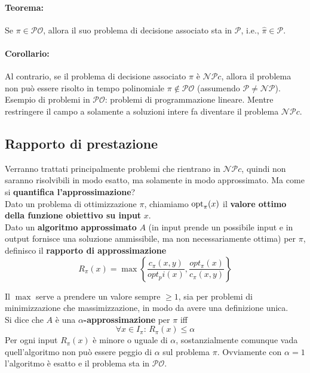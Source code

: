\paragraph{Teorema:} Se $\pi \in \mathcal{PO}$, allora il suo problema di decisione associato sta in $\mathcal{P}$, i.e., $\hat{\pi} \in \mathcal{P}$.\\

\paragraph{Corollario:} Al contrario, se il problema di decisione associato $\hat{\pi}$ è $\mathcal{NP}c$, allora il problema non può essere risolto in tempo polinomiale $\pi \notin \mathcal{PO}$ (assumendo $\mathcal{P} \neq \mathcal{NP}$).\\

Esempio di problemi in $\mathcal{PO}$: problemi di programmazione lineare. Mentre restringere il campo a solamente a soluzioni intere fa diventare il problema $\mathcal{NP}c$.\\

\newpage

\subsection{Rapporto di prestazione} 

Verranno trattati principalmente problemi che rientrano in $\mathcal{NP}c$, quindi non saranno risolvibili in modo esatto, ma solamente in modo approssimato. Ma come si \textbf{quantifica l'approssimazione}? \\

Dato un problema di ottimizzazione $\pi$, chiamiamo $\operatorname*{opt}_\pi (x)$ il \textbf{valore ottimo della funzione obiettivo su input} $x$.\\
Dato un \textbf{algoritmo approssimato} $A$ (in input prende un possibile input e in output fornisce una soluzione ammissibile, ma non necessariamente ottima) per $\pi$, definisco il \textbf{rapporto di approssimazione} 
$$ R_\pi (x) = \max \left\{\frac{c_\pi (x,y)}{opt_pi(x)}, \frac{opt_\pi (x)}{c_\pi (x,y)} \right\} $$

Il $\max$ serve a prendere un valore sempre $\geq 1$, sia per problemi di minimizzazione che massimizzazione, in modo da avere una definizione unica.\\

Si dice che $A$ è una \textbf{$\alpha$-approssimazione} per $\pi$ iff 
$$ \forall x \in I_\pi : \, R_\pi (x) \leq \alpha $$
Per ogni input $R_\pi (x)$ è minore o uguale di $\alpha$, sostanzialmente comunque vada quell'algoritmo non può essere peggio di $\alpha$ sul problema $\pi$. Ovviamente con $\alpha = 1$ l'algoritmo è esatto e il problema sta in $\mathcal{PO}$.\\

